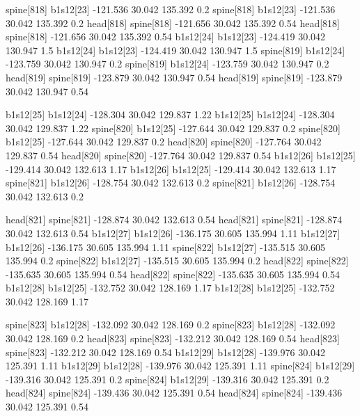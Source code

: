 spine[818]    b1s12[23]    -121.536    30.042    135.392    0.2
spine[818]    b1s12[23]    -121.536    30.042    135.392    0.2
head[818]    spine[818]    -121.656    30.042    135.392    0.54
head[818]    spine[818]    -121.656    30.042    135.392    0.54
b1s12[24]    b1s12[23]    -124.419    30.042    130.947    1.5
b1s12[24]    b1s12[23]    -124.419    30.042    130.947    1.5
spine[819]    b1s12[24]    -123.759    30.042    130.947    0.2
spine[819]    b1s12[24]    -123.759    30.042    130.947    0.2
head[819]    spine[819]    -123.879    30.042    130.947    0.54
head[819]    spine[819]    -123.879    30.042    130.947    0.54


b1s12[25]    b1s12[24]    -128.304    30.042    129.837    1.22
b1s12[25]    b1s12[24]    -128.304    30.042    129.837    1.22
spine[820]    b1s12[25]    -127.644    30.042    129.837    0.2
spine[820]    b1s12[25]    -127.644    30.042    129.837    0.2
head[820]    spine[820]    -127.764    30.042    129.837    0.54
head[820]    spine[820]    -127.764    30.042    129.837    0.54
b1s12[26]    b1s12[25]    -129.414    30.042    132.613    1.17
b1s12[26]    b1s12[25]    -129.414    30.042    132.613    1.17
spine[821]    b1s12[26]    -128.754    30.042    132.613    0.2
spine[821]    b1s12[26]    -128.754    30.042    132.613    0.2


head[821]    spine[821]    -128.874    30.042    132.613    0.54
head[821]    spine[821]    -128.874    30.042    132.613    0.54
b1s12[27]    b1s12[26]    -136.175    30.605    135.994    1.11
b1s12[27]    b1s12[26]    -136.175    30.605    135.994    1.11
spine[822]    b1s12[27]    -135.515    30.605    135.994    0.2
spine[822]    b1s12[27]    -135.515    30.605    135.994    0.2
head[822]    spine[822]    -135.635    30.605    135.994    0.54
head[822]    spine[822]    -135.635    30.605    135.994    0.54
b1s12[28]    b1s12[25]    -132.752    30.042    128.169    1.17
b1s12[28]    b1s12[25]    -132.752    30.042    128.169    1.17


spine[823]    b1s12[28]    -132.092    30.042    128.169    0.2
spine[823]    b1s12[28]    -132.092    30.042    128.169    0.2
head[823]    spine[823]    -132.212    30.042    128.169    0.54
head[823]    spine[823]    -132.212    30.042    128.169    0.54
b1s12[29]    b1s12[28]    -139.976    30.042    125.391    1.11
b1s12[29]    b1s12[28]    -139.976    30.042    125.391    1.11
spine[824]    b1s12[29]    -139.316    30.042    125.391    0.2
spine[824]    b1s12[29]    -139.316    30.042    125.391    0.2
head[824]    spine[824]    -139.436    30.042    125.391    0.54
head[824]    spine[824]    -139.436    30.042    125.391    0.54



